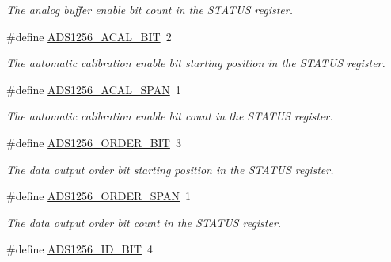 \begin{DoxyCompactItemize}
\begin{DoxyCompactList}\small\item\em The analog buffer enable bit count in the S\-T\-A\-T\-U\-S register. \end{DoxyCompactList}\item 
\hypertarget{group__status__register_ga94588026849071dfdf4bacbdbf24976a}{\#define \hyperlink{group__status__register_ga94588026849071dfdf4bacbdbf24976a}{A\-D\-S1256\-\_\-\-A\-C\-A\-L\-\_\-\-B\-I\-T}~2}\label{group__status__register_ga94588026849071dfdf4bacbdbf24976a}

\begin{DoxyCompactList}\small\item\em The automatic calibration enable bit starting position in the S\-T\-A\-T\-U\-S register. \end{DoxyCompactList}\item 
\hypertarget{group__status__register_gacccdeffab4e1942cec3794851ef228c7}{\#define \hyperlink{group__status__register_gacccdeffab4e1942cec3794851ef228c7}{A\-D\-S1256\-\_\-\-A\-C\-A\-L\-\_\-\-S\-P\-A\-N}~1}\label{group__status__register_gacccdeffab4e1942cec3794851ef228c7}

\begin{DoxyCompactList}\small\item\em The automatic calibration enable bit count in the S\-T\-A\-T\-U\-S register. \end{DoxyCompactList}\item 
\hypertarget{group__status__register_ga295221d00dc4ae777c591ffdbc7f8922}{\#define \hyperlink{group__status__register_ga295221d00dc4ae777c591ffdbc7f8922}{A\-D\-S1256\-\_\-\-O\-R\-D\-E\-R\-\_\-\-B\-I\-T}~3}\label{group__status__register_ga295221d00dc4ae777c591ffdbc7f8922}

\begin{DoxyCompactList}\small\item\em The data output order bit starting position in the S\-T\-A\-T\-U\-S register. \end{DoxyCompactList}\item 
\hypertarget{group__status__register_gaa07ca51df9b9ce477186cf92d331a59c}{\#define \hyperlink{group__status__register_gaa07ca51df9b9ce477186cf92d331a59c}{A\-D\-S1256\-\_\-\-O\-R\-D\-E\-R\-\_\-\-S\-P\-A\-N}~1}\label{group__status__register_gaa07ca51df9b9ce477186cf92d331a59c}

\begin{DoxyCompactList}\small\item\em The data output order bit count in the S\-T\-A\-T\-U\-S register. \end{DoxyCompactList}\item 
\hypertarget{group__status__register_ga14da33a69f54e320a00c3e33e9dcf44a}{\#define \hyperlink{group__status__register_ga14da33a69f54e320a00c3e33e9dcf44a}{A\-D\-S1256\-\_\-\-I\-D\-\_\-\-B\-I\-T}~4}\label{group__status__register_ga14da33a69f54e320a00c3e33e9dcf44a}


\end{DoxyCompactItemize}
